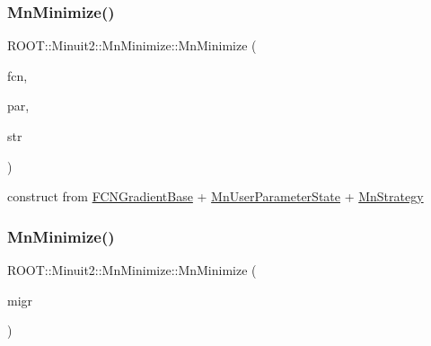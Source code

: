 \subsubsection{\texorpdfstring{MnMinimize()}{MnMinimize()}\hspace{0.1cm}{\footnotesize\ttfamily [25/26]}}
{\footnotesize\ttfamily R\+O\+O\+T\+::\+Minuit2\+::\+Mn\+Minimize\+::\+Mn\+Minimize (\begin{DoxyParamCaption}\item[{const \mbox{\hyperlink{classROOT_1_1Minuit2_1_1FCNGradientBase}{F\+C\+N\+Gradient\+Base}} \&}]{fcn,  }\item[{const \mbox{\hyperlink{classROOT_1_1Minuit2_1_1MnUserParameterState}{Mn\+User\+Parameter\+State}} \&}]{par,  }\item[{const \mbox{\hyperlink{classROOT_1_1Minuit2_1_1MnStrategy}{Mn\+Strategy}} \&}]{str }\end{DoxyParamCaption})\hspace{0.3cm}{\ttfamily [inline]}}



construct from \mbox{\hyperlink{classROOT_1_1Minuit2_1_1FCNGradientBase}{F\+C\+N\+Gradient\+Base}} + \mbox{\hyperlink{classROOT_1_1Minuit2_1_1MnUserParameterState}{Mn\+User\+Parameter\+State}} + \mbox{\hyperlink{classROOT_1_1Minuit2_1_1MnStrategy}{Mn\+Strategy}} 

\mbox{\label{classROOT_1_1Minuit2_1_1MnMinimize_a5381e16cfd79c2b4da61e399a6a02b35}} 
\subsubsection{\texorpdfstring{MnMinimize()}{MnMinimize()}\hspace{0.1cm}{\footnotesize\ttfamily [26/26]}}
{\footnotesize\ttfamily R\+O\+O\+T\+::\+Minuit2\+::\+Mn\+Minimize\+::\+Mn\+Minimize (\begin{DoxyParamCaption}\item[{const \mbox{\hyperlink{classROOT_1_1Minuit2_1_1MnMinimize}{Mn\+Minimize}} \&}]{migr }\end{DoxyParamCaption})\hspace{0.3cm}{\ttfamily [inline]}}

\mbox{\label{classROOT_1_1Minuit2_1_1MnMinimize_ae4544af29d79b1415179ce48c05b9ae0}} 
